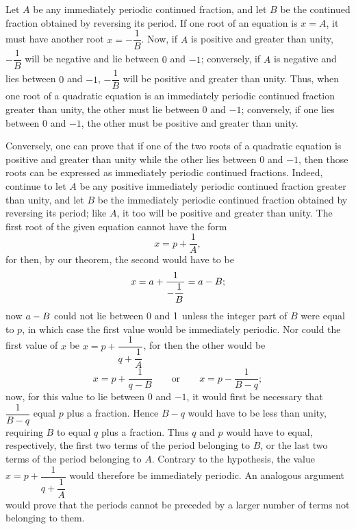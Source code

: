 Let $A$ be any immediately periodic continued fraction, and let $B$ be the
continued fraction obtained by reversing its period. If one root of an equation
is $x=A$, it must have another root $x=-\dfrac{1}{B}$. Now, if $A$ is positive
and greater than unity, $-\dfrac{1}{B}$ will be negative and lie between $0$
and $-1$; conversely, if $A$ is negative and lies between $0$ and $-1$,
$-\dfrac{1}{B}$ will be positive and greater than unity. Thus, when one root
of a quadratic equation is an immediately periodic continued fraction greater
than unity, the other must lie between $0$ and $-1$; conversely, if one lies
between $0$ and $-1$, the other must be positive and greater than unity.

Conversely, one can prove that if one of the two roots of a quadratic equation
is positive and greater than unity while the other lies between $0$ and $-1$,
then those roots can be expressed as immediately periodic continued fractions.
Indeed, continue to let $A$ be any positive immediately periodic continued
fraction greater than unity, and let $B$ be the immediately periodic continued
fraction obtained by reversing its period; like $A$, it too will be positive
and greater than unity. The first root of the given equation cannot have the form
\[
  x = p + \frac{1}{A},
\]
%
for then, by our theorem, the second would have to be
\[
  x = \GalPrintedError{a}{W03-PE001} + \frac{1}{-\dfrac{1}{B}}
    = \GalPrintedError{a}{W03-PE001} - B ;
\]
now $\GalPrintedError{a}{W03-PE001}-B$ could not lie between $0$ and
$\GalPrintedError{1}{W03-PE002}$ unless the integer part of $B$ were equal to
$p$, in which case the first value would be immediately periodic. Nor could
the first value of $x$ be $x=p+\dfrac{1}{q+\dfrac{1}{A}}$, for then the other
would be
\[
  x = p + \frac{1}{q - B} \qquad \text{or} \qquad
  x = p - \frac{1}{B - q};
\]
now, for this value to lie between $0$ and $-1$, it would first be necessary
that $\dfrac{1}{B-q}$ equal $p$ plus a fraction. Hence $B-q$ would have to be
less than unity, requiring $B$ to equal $q$ plus a fraction. Thus $q$ and $p$
would have to equal, respectively, the first two terms of the period belonging
to $B$, or the last two terms of the period belonging to $A$. Contrary to the
hypothesis, the value $x=p+\dfrac{1}{q+\dfrac{1}{A}}$ would therefore be
immediately periodic. An analogous argument would prove that the periods
cannot be preceded by a larger number of terms not belonging to them.

